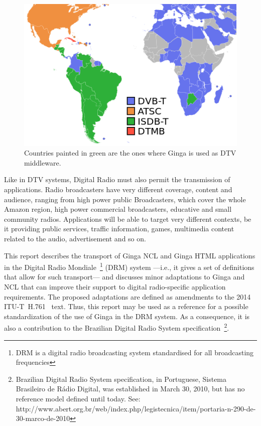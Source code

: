\documentclass[11pt]{article}
\begin{document}
\begin{figure}[H]
  \centering
  \includegraphics[scale=0.5]{images/map_ginga.png}
  \caption{Countries painted in green are the ones where Ginga is used as DTV
           middleware.}
  \label{figureginga}
\end{figure}

Like in DTV systems, Digital Radio must also permit the transmission of
applications. Radio broadcasters have very different coverage, content and
audience, ranging from high power public Broadcasters, which cover the whole
Amazon region, high power commercial broadcasters, educative and small
community radios. Applications will be able to target very different
contexts, be it providing public services, traffic information, games,
multimedia content related to the audio, advertisement and so on.

This report describes the transport of Ginga NCL and Ginga HTML applications in
the Digital Radio Mondiale~\footnote{DRM is a digital radio broadcasting system standardised
for all broadcasting frequencies} (DRM) system ---i.e., it gives a set of
definitions that allow for such transport--- and discusses minor adaptations
to Ginga and NCL that can improve their support to digital radio-specific
application requirements. The proposed adaptations are defined as amendments to
the 2014 ITU-T~H.761~\cite{ITU-T-H761-2014} text. Thus, this report may be used
as a reference for a possible standardization of the use of Ginga in the DRM
system. As a consequence, it is also a contribution to the Brazilian Digital
Radio System specification~\footnote {Brazilian
Digital Radio System specification, in Portuguese, Sistema Brasileiro de
Rádio Digital, was established in March 30, 2010, but has no reference model
defined until today. See:
http://www.abert.org.br/web/index.php/legistecnica/item/portaria-n-290-de-30-marco-de-2010}.
\end{document}
